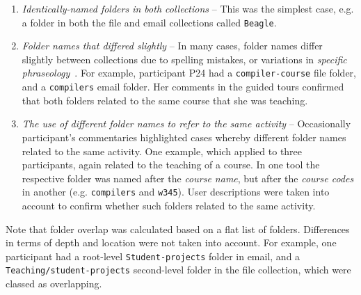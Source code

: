 \begin{enumerate}

\item \textit{Identically-named folders in both collections} -- This was the simplest case, e.g. a folder in both the file and email collections called \texttt{Beagle}.

\item \textit{Folder names that differed slightly} -- In many cases, folder names differ slightly between collections due to spelling mistakes, or variations in \textit{specific phraseology}~\citep{gd:01}.  For example, participant P24 had a \texttt{compiler-course} file folder, and a \texttt{compilers} email folder.  Her comments in the guided tours confirmed that both folders related to the same course that she was teaching.	 %

\item \textit{The use of different folder names to refer to the same activity} -- Occasionally participant's commentaries highlighted cases whereby different folder names related to the same activity.  One example, which applied to three participants, again related to the teaching of a course.  In one tool the respective folder was named after the \textit{course name}, but after the \textit{course codes} in another (e.g. \texttt{compilers} and \texttt{w345}).  User descriptions were taken into account to confirm whether such folders related to the same activity.

\end{enumerate}

Note that folder overlap was calculated based on a flat list of folders. Differences in terms of depth and location were not taken into account.  For example, one participant had a root-level \texttt{Student-projects} folder in email, and a \texttt{Teaching/student-projects} second-level folder in the file collection, which were classed as overlapping.

